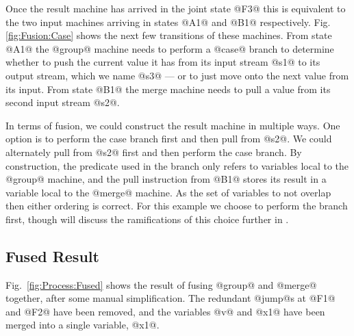 Once the result machine has arrived in the joint state @F3@ this is equivalent to the two input machines arriving in states @A1@ and @B1@ respectively. Fig. \ref{fig:Fusion:Case} shows the next few transitions of these machines. From state @A1@ the @group@ machine needs to perform a @case@ branch to determine whether to push the current value it has from its input stream @s1@ to its output stream, which we name @s3@ --- or to just move onto the next value from its input. From state @B1@ the merge machine needs to pull a value from its second input stream @s2@. 

In terms of fusion, we could construct the result machine in multiple ways. One option is to perform the case branch first and then pull from @s2@. We could alternately pull from @s2@ first and then perform the case branch. By construction, the predicate used in the branch only refers to variables local to the @group@ machine, and the pull instruction from @B1@ stores its result in a variable local to the @merge@ machine. As the set of variables to not overlap then either ordering is correct. For this example we choose to perform the branch first, though will discuss the ramifications of this choice further in .

\subsection{Fused Result}

Fig.~\ref{fig:Process:Fused} shows the result of fusing @group@ and @merge@ together, after some manual simplification.
The redundant @jump@s at @F1@ and @F2@ have been removed, and the variables @v@ and @x1@ have been merged into a single variable, @x1@.


